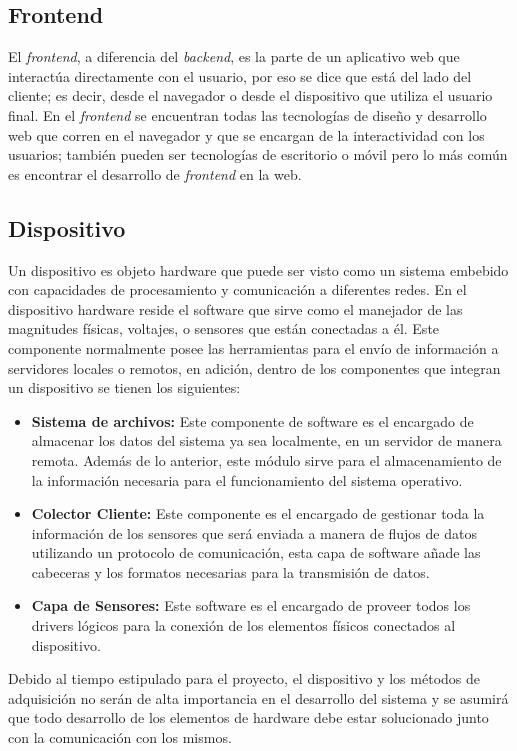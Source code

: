 \subsection{Frontend}

El \textit{frontend}, a diferencia del \textit{backend}, es la parte de un aplicativo web que interactúa directamente con el usuario, por eso se dice que está del lado del cliente; es decir, desde el navegador o desde el dispositivo que utiliza el usuario final. En el \textit{frontend} se encuentran todas las tecnologías de diseño y desarrollo web que corren en el navegador y que se encargan de la interactividad con los usuarios; también pueden ser tecnologías de escritorio o móvil pero lo más común es encontrar el desarrollo de \textit{frontend} en la web.

\subsection{Dispositivo}
Un dispositivo es objeto hardware que puede ser visto como un sistema embebido con capacidades de procesamiento y comunicación a diferentes redes. En el dispositivo hardware reside el software que sirve como el manejador de las magnitudes físicas, voltajes, o sensores que están conectadas a él. Este componente normalmente posee las herramientas para el envío de información a servidores locales o remotos, en adición, dentro de los componentes que integran un dispositivo se tienen los siguientes:

\begin{itemize}
	\item \textbf{Sistema de archivos:} Este componente de software es el encargado de almacenar los datos del sistema ya sea localmente, en un servidor de manera remota. Además de lo anterior, este módulo sirve para el almacenamiento de la información necesaria para el funcionamiento del sistema operativo. 
	
	\item \textbf{Colector Cliente:} Este componente es el encargado de gestionar toda la información de los sensores que será enviada a manera de flujos de datos utilizando un protocolo de comunicación, esta capa de software añade las cabeceras y los formatos necesarias para la transmisión de datos.
	\item \textbf{Capa de Sensores:} Este software es el encargado de proveer todos los drivers lógicos para la conexión de los elementos físicos conectados al dispositivo.
\end{itemize}
Debido al tiempo estipulado para el proyecto, el dispositivo y los métodos de adquisición no serán de alta importancia en el desarrollo del sistema y se asumirá que todo desarrollo de los elementos de hardware debe estar solucionado junto con la comunicación con los mismos.



